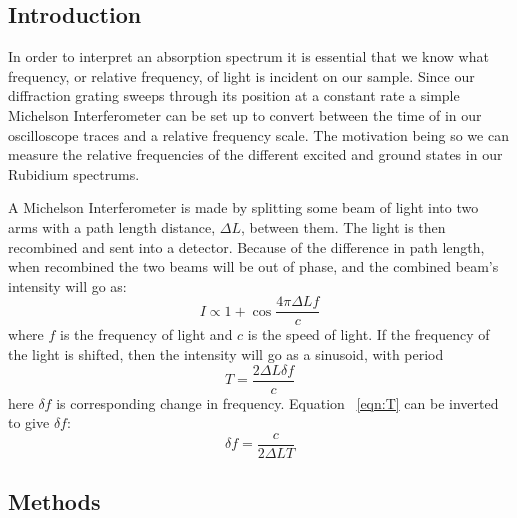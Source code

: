 \documentclass[paper=a4, fontsize=11pt]{scrartcl} %
\numberwithin{equation}{section}
\numberwithin{figure}{section}
\numberwithin{table}{section}
\begin{document}
\subsection{Introduction}

In order to interpret an absorption spectrum it is essential that we
know what frequency, or relative frequency, of light is incident on
our sample. Since our diffraction grating sweeps through its position
at a constant rate a simple Michelson Interferometer can be set up to
convert between the time of in our oscilloscope traces and a relative
frequency scale. The motivation being so we can measure the relative
frequencies of the different excited and ground states in our Rubidium
spectrums.

A Michelson Interferometer is made by splitting some beam of light
into two arms with a path length distance, $\Delta L$, between
them. The light is then recombined and sent into a detector. Because
of the difference in path length, when recombined the two beams will
be out of phase, and the combined beam's intensity will go as:
\begin{equation}
I \propto 1 + \cos \frac{4\pi \Delta Lf}{c}
\end{equation}
where $f$ is the frequency of light and $c$ is the speed of light. If
the frequency of the light is shifted, then the intensity will go as a
sinusoid, with period 
\begin{equation}
\label{eqn:T}
T = \frac{2\Delta L \delta f}{c}
\end{equation}
here $\delta f$ is corresponding change in frequency. Equation
~\ref{eqn:T} can be inverted to give $\delta f$:
\begin{equation}
\label{eqn:df}
\delta f = \frac{c}{2\Delta L T}
\end{equation}

\subsection{Methods}
\end{document}
